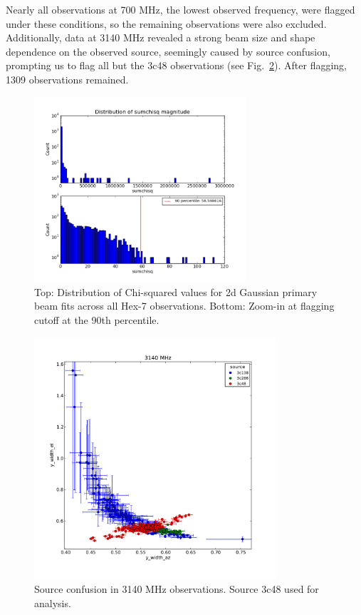 \documentclass[preprint]{aastex}
\begin{document}
Nearly all observations at 700 MHz, the lowest observed frequency,
were flagged under these conditions, so the remaining observations
were also excluded.  Additionally, data at 3140 MHz revealed a strong
beam size and shape dependence on the observed source, seemingly
caused by source confusion, prompting us to flag all but the 3c48
observations (see Fig.~\ref{fig.source_confusion}).  After flagging,
1309 observations remained.

\begin{figure}[h!]
\begin{center}
\includegraphics[width=0.7\textwidth]{images/dist_sumchisq.png}
\caption{Top: Distribution of Chi-squared values for 2d Gaussian
  primary beam fits across all Hex-7 observations.  Bottom: Zoom-in at
  flagging cutoff at the 90th percentile. \label{fig.dist_sumchisq}}
\end{center}
\end{figure}

\begin{figure}[h!]
\begin{center}
\includegraphics[width=0.8\textwidth]{images/source_confusion.pdf}
\caption{Source confusion in 3140 MHz observations.  Source 3c48 used
  for analysis. \label{fig.source_confusion}}
\end{center}
\end{figure}
\end{document}
